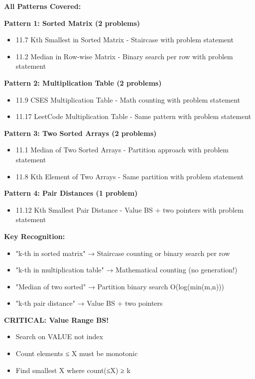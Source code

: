 \documentclass[11pt,a4paper,oneside]{book}
\begin{document}
\begin{tcolorbox}[
    enhanced,breakable,
    colback=primaryblue!10,
    colframe=primaryblue,
    boxrule=2pt,
    arc=4mm,
    title=\textbf{Median and Kth Element: Complete Mastery}
]
\textbf{All Patterns Covered:}

\textbf{Pattern 1: Sorted Matrix (2 problems)}
\begin{itemize}
\item 11.7 Kth Smallest in Sorted Matrix - Staircase with problem statement
\item 11.2 Median in Row-wise Matrix - Binary search per row with problem statement
\end{itemize}

\textbf{Pattern 2: Multiplication Table (2 problems)}
\begin{itemize}
\item 11.9 CSES Multiplication Table - Math counting with problem statement
\item 11.17 LeetCode Multiplication Table - Same pattern with problem statement
\end{itemize}

\textbf{Pattern 3: Two Sorted Arrays (2 problems)}
\begin{itemize}
\item 11.1 Median of Two Sorted Arrays - Partition approach with problem statement
\item 11.8 Kth Element of Two Arrays - Same partition with problem statement
\end{itemize}

\textbf{Pattern 4: Pair Distances (1 problem)}
\begin{itemize}
\item 11.12 Kth Smallest Pair Distance - Value BS + two pointers with problem statement
\end{itemize}

\textbf{Key Recognition:}
\begin{itemize}
\item "k-th in sorted matrix" → Staircase counting or binary search per row
\item "k-th in multiplication table" → Mathematical counting (no generation!)
\item "Median of two sorted" → Partition binary search O(log(min(m,n)))
\item "k-th pair distance" → Value BS + two pointers
\end{itemize}

\textbf{CRITICAL: Value Range BS!}
\begin{itemize}
\item Search on VALUE not index
\item Count elements ≤ X must be monotonic
\item Find smallest X where count(≤X) ≥ k
\end{itemize}


\end{tcolorbox}
\end{document}
